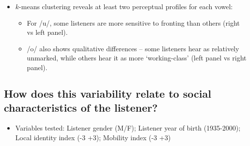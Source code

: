 \documentclass[a0,final]{a0poster}
\begin{document}
\begin{multicols}{4}
\begin{itemize}
\item{$k$-means clustering reveals at least two perceptual profiles for each vowel:\begin{itemize}\item{For /u/, some listeners are more sensitive to fronting than others (right vs left panel).}\item{/o/ also shows qualitative differences -- some listeners hear \textipa{[\o:]} as relatively unmarked, while others hear it as more `working-class' (left panel vs right panel).}\end{itemize}}
\end{itemize}
\columnbreak
\subsection*{How does this variability relate to social characteristics of the listener?}
\begin{itemize}
\item{Variables tested: Listener gender (M/F); Listener year of birth (1935-2000); Local identity index (-3 +3); Mobility index (-3 +3)}
\end{itemize}
\vspace*{-1cm}

\end{multicols}
\end{document}
